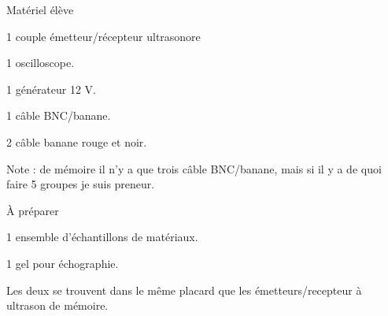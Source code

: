 
\begin{boiteMateriel}{Matériel élève}
  \effectifTerminaleStss

  \begin{listePoints}
    \item 1 couple émetteur/récepteur ultrasonore
    \item 1 oscilloscope.
    \item 1 générateur 12 V.
    \item 1 câble BNC/banane.
    \item 2 câble banane rouge et noir.
  \end{listePoints}
  Note : de mémoire il n'y a que trois câble BNC/banane, mais si il y a de quoi faire 5 groupes je suis preneur.
\end{boiteMateriel}

\begin{boiteMateriel}{À préparer}
  \begin{listePoints}
    \item 1 ensemble d'échantillons de matériaux.
    \item 1 gel pour échographie.
  \end{listePoints}
  Les deux se trouvent dans le même placard que les émetteurs/recepteur à ultrason de mémoire.
\end{boiteMateriel}